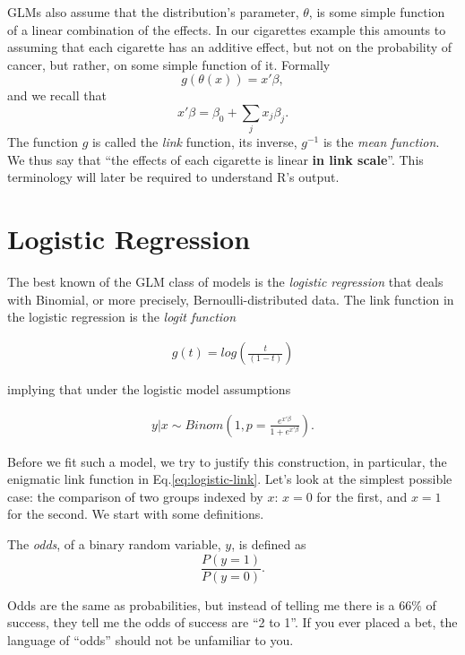 \documentclass[]{book}
\theoremstyle{definition}
\theoremstyle{definition}
\theoremstyle{definition}
\theoremstyle{remark}
\let\BeginKnitrBlock\begin \let\EndKnitrBlock\end
\begin{document}
GLMs also assume that the distribution's parameter, \(\theta\), is some
simple function of a linear combination of the effects. In our
cigarettes example this amounts to assuming that each cigarette has an
additive effect, but not on the probability of cancer, but rather, on
some simple function of it. Formally \[g(\theta(x))=x'\beta,\] and we
recall that \[x'\beta=\beta_0 + \sum_j x_j \beta_j.\] The function \(g\)
is called the \emph{link} function, its inverse, \(g^{-1}\) is the
\emph{mean function}. We thus say that ``the effects of each cigarette
is linear \textbf{in link scale}''. This terminology will later be
required to understand R's output.

\section{Logistic Regression}\label{logistic-regression}

The best known of the GLM class of models is the \emph{logistic
regression} that deals with Binomial, or more precisely,
Bernoulli-distributed data. The link function in the logistic regression
is the \emph{logit function}

\begin{align}
  g(t)=log\left( \frac{t}{(1-t)} \right)
  \label{eq:logistic-link}  
\end{align}

implying that under the logistic model assumptions

\begin{align}
  y|x \sim Binom \left( 1, p=\frac{e^{x'\beta}}{1+e^{x'\beta}} \right).
  \label{eq:logistic}
\end{align}

Before we fit such a model, we try to justify this construction, in
particular, the enigmatic link function in Eq.\eqref{eq:logistic-link}.
Let's look at the simplest possible case: the comparison of two groups
indexed by \(x\): \(x=0\) for the first, and \(x=1\) for the second. We
start with some definitions.

\BeginKnitrBlock{definition}[Odds]
\protect\hypertarget{def:unnamed-chunk-164}{}{\label{def:unnamed-chunk-164}
{} }The \emph{odds}, of a binary random variable,
\(y\), is defined as \[\frac{P(y=1)}{P(y=0)}.\]
\EndKnitrBlock{definition}

Odds are the same as probabilities, but instead of telling me there is a
\(66\%\) of success, they tell me the odds of success are ``2 to 1''. If
you ever placed a bet, the language of ``odds'' should not be unfamiliar
to you.
\end{document}
